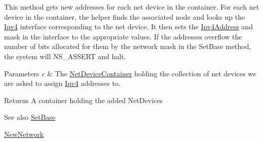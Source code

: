 This method gets new addresses for each net device in the container. For each net device in the container, the helper finds the associated node and looks up the \hyperlink{classns3_1_1Ipv4}{Ipv4} interface corresponding to the net device. It then sets the \hyperlink{classns3_1_1Ipv4Address}{Ipv4\+Address} and mask in the interface to the appropriate values. If the addresses overflow the number of bits allocated for them by the network mask in the Set\+Base method, the system will N\+S\+\_\+\+A\+S\+S\+E\+RT and halt.


\begin{DoxyParams}{Parameters}
{\em c} & The \hyperlink{classns3_1_1NetDeviceContainer}{Net\+Device\+Container} holding the collection of net devices we are asked to assign \hyperlink{classns3_1_1Ipv4}{Ipv4} addresses to.\\
\hline
\end{DoxyParams}
\begin{DoxyReturn}{Returns}
A container holding the added Net\+Devices 
\end{DoxyReturn}
\begin{DoxySeeAlso}{See also}
\hyperlink{classns3_1_1Ipv4AddressHelper_acf7b16dd25bac67e00f5e25f90a9a035}{Set\+Base} 

\hyperlink{classns3_1_1Ipv4AddressHelper_a3277d133ef0d2669934a16a8206ba8e4}{New\+Network} 
\end{DoxySeeAlso}

